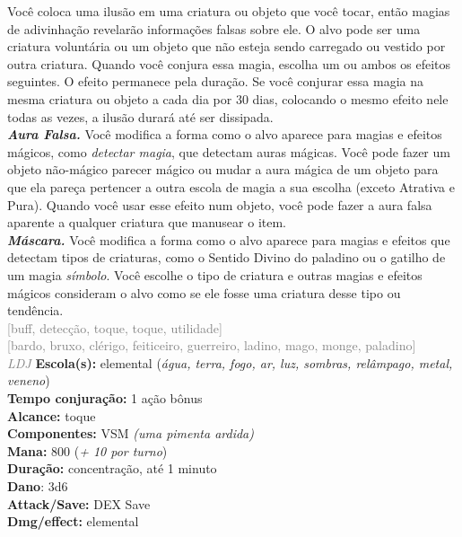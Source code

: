 \documentclass{RPG_Adventure}[2021/10/20]
\begin{document}
{\normalsize Você coloca uma ilusão em uma criatura ou objeto que você tocar, então magias de adivinhação revelarão informações falsas sobre ele. O alvo pode ser uma criatura voluntária ou um objeto que não esteja sendo carregado ou vestido por outra criatura.  Quando você conjura essa magia, escolha um ou ambos os efeitos seguintes. O efeito permanece pela duração. Se você conjurar essa magia na mesma criatura ou objeto a cada dia por 30 dias, colocando o mesmo efeito nele todas as vezes, a ilusão durará até ser dissipada.\\\t \textbf{\textit{Aura Falsa.}} Você modifica a forma como o alvo aparece para magias e efeitos mágicos, como \textit{detectar magia}, que detectam auras mágicas. Você pode fazer um objeto não-mágico parecer mágico ou mudar a aura mágica de um objeto para que ela pareça pertencer a outra escola de magia a sua escolha (exceto Atrativa e Pura). Quando você usar esse efeito num objeto, você pode fazer a aura falsa aparente a qualquer criatura que manusear o item.\\\t \textbf{\textit{Máscara.}} Você modifica a forma como o alvo aparece para magias e efeitos que detectam tipos de criaturas, como o Sentido Divino do paladino ou o gatilho de um magia \textit{símbolo}. Você escolhe o tipo de criatura e outras magias e efeitos mágicos consideram o alvo como se ele fosse uma criatura desse tipo ou tendência.\\}
{\scriptsize \textcolor{gray}{[buff, detecção, toque, toque, utilidade]\\}}
{\scriptsize \textcolor{gray}{[bardo, bruxo, clérigo, feiticeiro, guerreiro, ladino, mago, monge, paladino]\\}}
{\tiny \textcolor{gray}{\textit{LDJ}}}
{\small \t \textbf{Escola(s):} elemental (\textit{água, terra, fogo, ar, luz, sombras, relâmpago, metal, veneno})\\\t \textbf{Tempo conjuração:} 1 ação bônus\\\t \textbf{Alcance:} toque\\\t \textbf{Componentes:} VSM \textit{(uma pimenta ardida)}\\\t \textbf{Mana:} 800 (\textit{+ 10 por turno})\\\t \textbf{Duração:} concentração, até 1 minuto\\\t \textbf{Dano}: 3d6\\\t \textbf{Attack/Save:} DEX Save\\\t \textbf{Dmg/effect:} elemental\\}
\end{document}
